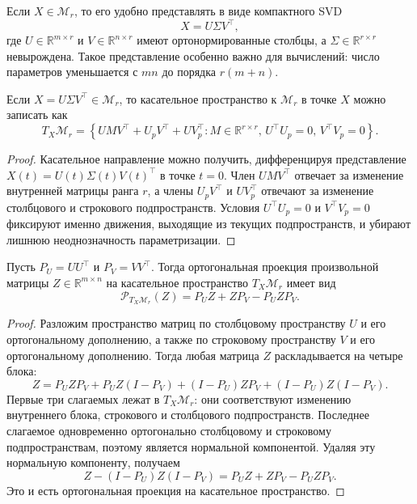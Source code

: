 \documentclass[a4paper,12pt]{article}
\newcommand{\R}{\mathbb{R}}
\renewcommand{\Proj}{\mathcal{P}}
\newcommand{\Mcal}{\mathcal{M}}
\begin{document}
Если $X \in \Mcal_r$, то его удобно представлять в виде компактного SVD
\[
X = U\Sigma V^\top,
\]
где $U \in \R^{m\times r}$ и $V \in \R^{n\times r}$ имеют ортонормированные столбцы, а $\Sigma \in \R^{r\times r}$ невырождена. Такое представление особенно важно для вычислений: число параметров уменьшается с $mn$ до порядка $r(m+n)$.

\begin{proposition}
Если $X=U\Sigma V^\top\in\Mcal_r$, то касательное пространство к $\Mcal_r$ в точке $X$ можно записать как
\[
T_X\Mcal_r =
\left\{
UMV^\top + U_pV^\top + UV_p^\top :
M \in \R^{r\times r},\,
U^\top U_p = 0,\,
V^\top V_p = 0
\right\}.
\]
\end{proposition}

\begin{proof}
Касательное направление можно получить, дифференцируя представление $X(t)=U(t)\Sigma(t)V(t)^\top$ в точке $t=0$. Член $UMV^\top$ отвечает за изменение внутренней матрицы ранга $r$, а члены $U_pV^\top$ и $UV_p^\top$ отвечают за изменение столбцового и строкового подпространств. Условия $U^\top U_p=0$ и $V^\top V_p=0$ фиксируют именно движения, выходящие из текущих подпространств, и убирают лишнюю неоднозначность параметризации.
\end{proof}

\begin{lemma}
Пусть $P_U=UU^\top$ и $P_V=VV^\top$. Тогда ортогональная проекция произвольной матрицы $Z\in\R^{m\times n}$ на касательное пространство $T_X\Mcal_r$ имеет вид
\begin{equation}
\label{eq:tangent-projection-fixed-rank}
\Proj_{T_X\Mcal_r}(Z)=P_UZ+ZP_V-P_UZP_V.
\end{equation}
\end{lemma}

\begin{proof}
Разложим пространство матриц по столбцовому пространству $U$ и его ортогональному дополнению, а также по строковому пространству $V$ и его ортогональному дополнению. Тогда любая матрица $Z$ раскладывается на четыре блока:
\[
Z=P_UZP_V+P_UZ(I-P_V)+(I-P_U)ZP_V+(I-P_U)Z(I-P_V).
\]
Первые три слагаемых лежат в $T_X\Mcal_r$: они соответствуют изменению внутреннего блока, строкового и столбцового подпространств. Последнее слагаемое одновременно ортогонально столбцовому и строковому подпространствам, поэтому является нормальной компонентой. Удаляя эту нормальную компоненту, получаем
\[
Z-(I-P_U)Z(I-P_V)=P_UZ+ZP_V-P_UZP_V.
\]
Это и есть ортогональная проекция на касательное пространство.
\end{proof}
\end{document}
